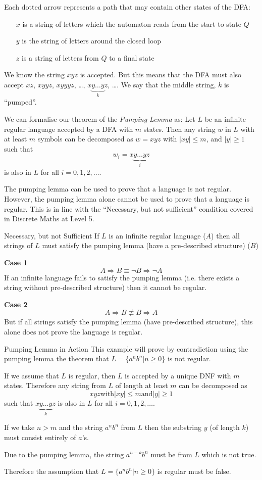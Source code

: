 Each dotted arrow represents a path that may contain other states of the DFA:
\begin{itemize}
    \item[$x$] is a string of letters which the automaton reads from the start to state $Q$
    \item[$y$] is the string of letters around the closed loop
    \item[$z$] is a string of letters from $Q$ to a final state
\end{itemize}

We know the string $xyz$ is accepted. But this means that the DFA must also accept $xz$, $xyyz$, $xyyyz$, \ldots, $x \underbrace{y\ldots y}_k z$, \ldots. We say that the middle string, $k$ is ``pumped''.

We can formalise our theorem of the \textit{Pumping Lemma} as: Let $L$ be an infinite regular language accepted by a DFA with $m$ states. Then any string $w$ in $L$ with at least $m$ symbols can be decomposed as $w=xyz$ with $|xy|\leq m$, and $|y| \geq 1$ such that
\[w_i = x\underbrace{y\ldots y}_i z\]
is also in $L$ for all $i=0,1,2,\ldots$.

The pumping lemma can be used to prove that a language is not regular. However, the pumping lemma alone cannot be used to prove that a language is regular. This is in line with the ``Necessary, but not sufficient'' condition covered in Discrete Maths at Level 5. 

\begin{example}{Necessary, but not Sufficient}
If $L$ is an infinite regular language ($A$) then all strings of $L$ must satisfy the pumping lemma (have a pre-described structure) ($B$)

\textbf{Case 1}
\[A \Rightarrow B \equiv \neg B \Rightarrow \neg A\]
If an infinite language fails to satisfy the pumping lemma (i.e. there exists a string without pre-described structure) then it cannot be regular.

\textbf{Case 2}
\[A \Rightarrow B \not\equiv B \Rightarrow A\]
But if all strings satisfy the pumping lemma (have pre-described structure), this alone does not prove the language is regular.
\end{example}

\begin{example}{Pumping Lemma in Action}
This example will prove by contradiction using the pumping lemma the theorem that $L=\{a^nb^n | n \geq 0\}$ is not regular.

If we assume that $L$ is regular, then $L$ is accepted by a unique DNF with $m$ states. Therefore any string from $L$ of length at least $m$ can be decomposed as
\[xyz \textrm{with} |xy| \leq m \textrm{and} |y| \geq 1\]
such that $x \underbrace{y\ldots y}_k z$ is also in $L$ for all $i=0,1,2,\ldots$.

If we take $n>m$ and the string $a^nb^n$ from $L$ then the substring $y$ (of length $k$) must consist entirely of $a$'s.

Due to the pumping lemma, the string $a^{n-k}b^n$ must be from $L$ which is not true.

Therefore the assumption that $L=\{a^nb^n | n \geq 0\}$ is regular must be false.
\end{example}


